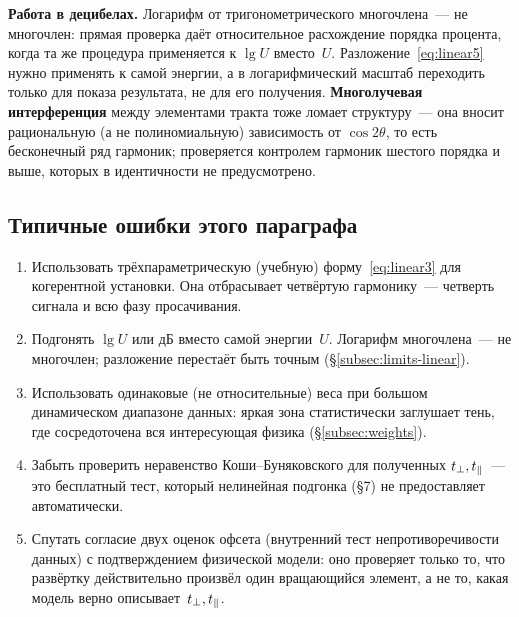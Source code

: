 \begin{warning}
\textbf{Работа в децибелах.} Логарифм от тригонометрического многочлена~--- не многочлен: прямая
проверка даёт относительное расхождение порядка процента, когда та же процедура применяется к
$\lg U$ вместо~$U$. Разложение~\eqref{eq:linear5} нужно применять к самой энергии, а в
логарифмический масштаб переходить только для показа результата, не для его получения.
\textbf{Многолучевая интерференция} между элементами тракта тоже ломает структуру~--- она вносит
рациональную (а не полиномиальную) зависимость от $\cos2\theta$, то есть бесконечный ряд
гармоник; проверяется контролем гармоник шестого порядка и выше, которых в идентичности не
предусмотрено.
\end{warning}

\subsection{Типичные ошибки этого параграфа}

\begin{enumerate}[leftmargin=1.6em,itemsep=0.25em]
  \item Использовать трёхпараметрическую (учебную) форму~\eqref{eq:linear3} для когерентной
        установки. Она отбрасывает четвёртую гармонику~--- четверть сигнала и всю фазу
        просачивания.
  \item Подгонять $\lg U$ или дБ вместо самой энергии~$U$. Логарифм многочлена~--- не многочлен;
        разложение перестаёт быть точным (§\ref{subsec:limits-linear}).
  \item Использовать одинаковые (не относительные) веса при большом динамическом диапазоне
        данных: яркая зона статистически заглушает тень, где сосредоточена вся интересующая
        физика (§\ref{subsec:weights}).
  \item Забыть проверить неравенство Коши--Буняковского для полученных $t_{\perp},t_{\parallel}$~--- это
        бесплатный тест, который нелинейная подгонка (§7) не предоставляет автоматически.
  \item Спутать согласие двух оценок офсета (внутренний тест непротиворечивости данных) с
        подтверждением физической модели: оно проверяет только то, что развёртку действительно
        произвёл один вращающийся элемент, а не то, какая модель верно описывает~$t_{\perp},t_{\parallel}$.
\end{enumerate}

\clearpage
